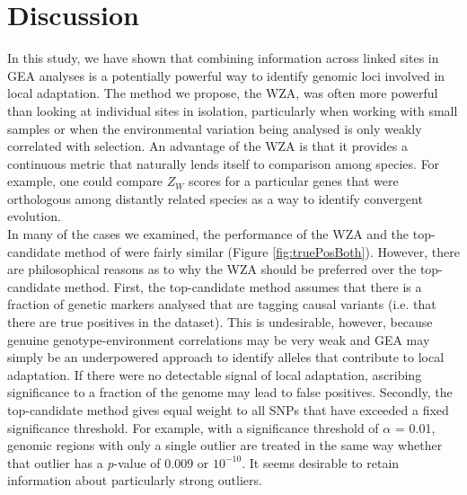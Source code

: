 \documentclass[10pt,twoside,lineno]{GSA_format}
\begin{document}

\section{Discussion}

In this study, we have shown that combining information across linked sites in GEA analyses is a potentially powerful way to identify genomic loci involved in local adaptation. The method we propose, the WZA, was often more powerful than looking at individual sites in isolation, particularly when working with small samples or when the environmental variation being analysed is only weakly correlated with selection. An advantage of the WZA is that it provides a continuous metric that naturally lends itself to comparison among species. For example, one could compare $Z_W$ scores for a particular genes that were orthologous among distantly related species as a way to identify convergent evolution.  \\

In many of the cases we examined, the performance of the WZA and the top-candidate method of \cite{Yeaman2016} were fairly similar (Figure \ref{fig:truePosBoth}). However, there are philosophical reasons as to why the WZA should be preferred over the top-candidate method. First, the top-candidate method assumes that there is a fraction of genetic markers analysed that are tagging causal variants (i.e. that there are true positives in the dataset). This is undesirable, however, because genuine genotype-environment correlations may be very weak and GEA may simply be an underpowered approach to identify alleles that contribute to local adaptation. If there were no detectable signal of local adaptation, ascribing significance to a fraction of the genome may lead to false positives. Secondly, the top-candidate method gives equal weight to all SNPs that have exceeded a fixed significance threshold. For example, with a significance threshold of \textit{$\alpha$} = 0.01, genomic regions with only a single outlier are treated in the same way whether that outlier has a \textit{p}-value of 0.009 or $10^{-10}$. It seems desirable to retain information about particularly strong outliers. \\
\end{document}
